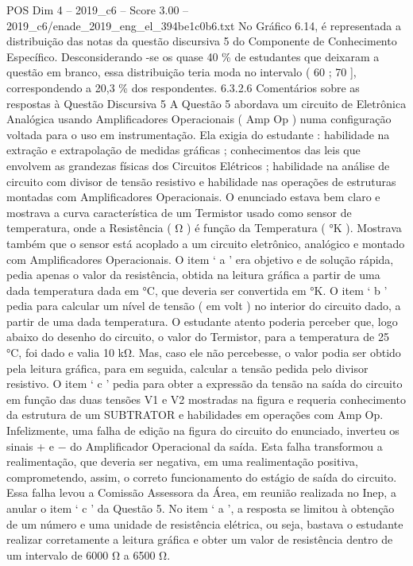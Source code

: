 \begin{textsample}{POS Dim 4 – 2019\_c6 – Score 3.00 – 2019\_c6/enade\_2019\_eng\_el\_394be1c0b6.txt}
No Gráfico 6.14, é representada a distribuição das notas da questão discursiva 5 do Componente de Conhecimento Específico.
Desconsiderando -se os quase 40 \% de estudantes que deixaram a questão em branco, essa distribuição teria moda no intervalo ( 60 ; 70 ], correspondendo a 20,3 \% dos respondentes. 6.3.2.6 Comentários sobre as respostas à Questão Discursiva 5 A Questão 5 abordava um circuito de Eletrônica Analógica usando Amplificadores Operacionais ( Amp Op ) numa configuração voltada para o uso em instrumentação.
Ela exigia do estudante : habilidade na extração e extrapolação de medidas gráficas ; conhecimentos das leis que envolvem as grandezas físicas dos Circuitos Elétricos ; habilidade na análise de circuito com divisor de tensão resistivo e habilidade nas operações de estruturas montadas com Amplificadores Operacionais.
O enunciado estava bem claro e mostrava a curva característica de um Termistor usado como sensor de temperatura, onde a Resistência ( Ω ) é função da Temperatura ( {\EmojiFont °}K ).
Mostrava também que o sensor está acoplado a um circuito eletrônico, analógico e montado com Amplificadores Operacionais.
O item ‘ a ’ era objetivo e de solução rápida, pedia apenas o valor da resistência, obtida na leitura gráfica a partir de uma dada temperatura dada em {\EmojiFont °}C, que deveria ser convertida em {\EmojiFont °}K.
O item ‘ b ’ pedia para calcular um nível de tensão ( em volt ) no interior do circuito dado, a partir de uma dada temperatura.
O estudante atento poderia perceber que, logo abaixo do desenho do circuito, o valor do Termistor, para a temperatura de 25 {\EmojiFont °}C, foi dado e valia 10 kΩ.
Mas, caso ele não percebesse, o valor podia ser obtido pela leitura gráfica, para em seguida, calcular a tensão pedida pelo divisor resistivo.
O item ‘ c ’ pedia para obter a expressão da tensão na saída do circuito em função das duas tensões V1 e V2 mostradas na figura e requeria conhecimento da estrutura de um SUBTRATOR e habilidades em operações com Amp Op.
Infelizmente, uma falha de edição na figura do circuito do enunciado, inverteu os sinais + e − do Amplificador Operacional da saída.
Esta falha transformou a realimentação, que deveria ser negativa, em uma realimentação positiva, comprometendo, assim, o correto funcionamento do estágio de saída do circuito.
Essa falha levou a Comissão Assessora da Área, em reunião realizada no Inep, a anular o item ‘ c ’ da Questão 5.
No item ‘ a ’, a resposta se limitou à obtenção de um número e uma unidade de resistência elétrica, ou seja, bastava o estudante realizar corretamente a leitura gráfica e obter um valor de resistência dentro de um intervalo de 6000 Ω a 6500 Ω.

\end{textsample}
